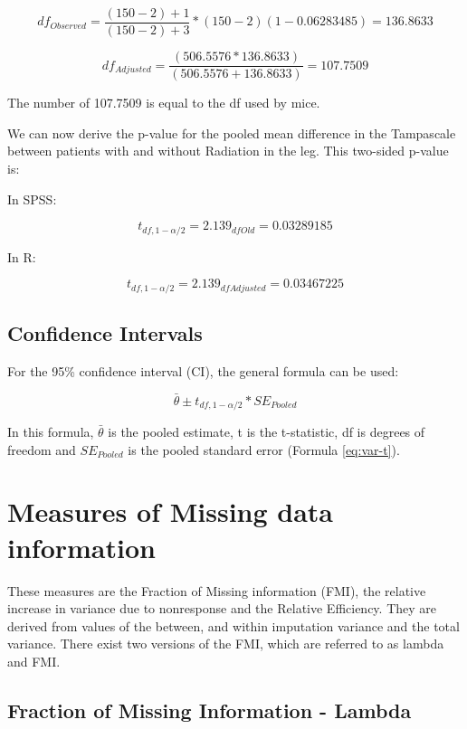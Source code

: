 \documentclass[
]{book}
\begin{document}
\[df_{Observed} = \frac{(150-2)+1}{(150-2)+3}*(150-2)(1- 0.06283485)=136.8633\]

\[df_{Adjusted} = \frac{(506.5576* 136.8633)}{(506.5576+ 136.8633)}=107.7509\]

The number of 107.7509 is equal to the df used by mice.

We can now derive the p-value for the pooled mean difference in the Tampascale between patients with and without Radiation in the leg. This two-sided p-value is:

In SPSS:

\[t_{df,1-\alpha/2}=2.139_{df{Old}}=0.03289185\]

In R:

\[t_{df,1-\alpha/2}=2.139_{df{Adjusted}}=0.03467225\]

\hypertarget{confidence-intervals}{%
\section{Confidence Intervals}\label{confidence-intervals}}

For the 95\% confidence interval (CI), the general formula can be used:

\begin{equation}
\bar{\theta} ± t_{df,1-\alpha/2} * SE_{Pooled}
  \label{eq:conf}
\end{equation}

In this formula, \(\bar{\theta}\) is the pooled estimate, t is the t-statistic, df is degrees of freedom and \(SE_{Pooled}\) is the pooled standard error (Formula \eqref{eq:var-t}).

\hypertarget{measures-of-missing-data-information}{%
\chapter{Measures of Missing data information}\label{measures-of-missing-data-information}}

These measures are the Fraction of Missing information (FMI), the relative increase in variance due to nonresponse and the Relative Efficiency. They are derived from values of the between, and within imputation variance and the total variance. There exist two versions of the FMI, which are referred to as lambda and FMI.

\hypertarget{fraction-of-missing-information---lambda}{%
\section{Fraction of Missing Information - Lambda}\label{fraction-of-missing-information---lambda}}
\end{document}
